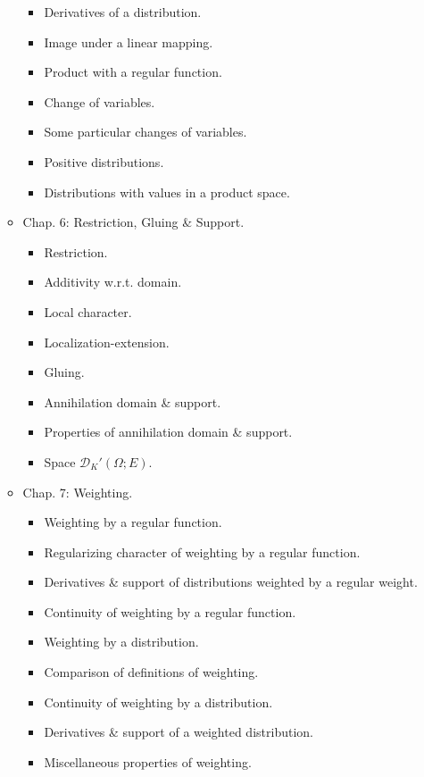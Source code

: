 \documentclass{article}
\begin{document}
\begin{enumerate}
\begin{itemize}
\begin{itemize}
			\item {\sf Derivatives of a distribution.}
			\item {\sf Image under a linear mapping.}
			\item {\sf Product with a regular function.}
			\item {\sf Change of variables.}
			\item {\sf Some particular changes of variables.}
			\item {\sf Positive distributions.}
			\item {\sf Distributions with values in a product space.}
		\end{itemize}
		\item {\sf Chap. 6: Restriction, Gluing \& Support.}
		\begin{itemize}
			\item {\sf Restriction.}
			\item {\sf Additivity w.r.t. domain.}
			\item {\sf Local character.}
			\item {\sf Localization-extension.}
			\item {\sf Gluing.}
			\item {\sf Annihilation domain \& support.}
			\item {\sf Properties of annihilation domain \& support.}
			\item {\sf Space $\mathcal{D}_K'(\Omega;E)$.}
		\end{itemize}
		\item {\sf Chap. 7: Weighting.}
		\begin{itemize}
			\item {\sf Weighting by a regular function.}
			\item {\sf Regularizing character of weighting by a regular function.}
			\item {\sf Derivatives \& support of distributions weighted by a regular weight.}
			\item {\sf Continuity of weighting by a regular function.}
			\item {\sf Weighting by a distribution.}
			\item {\sf Comparison of definitions of weighting.}
			\item {\sf Continuity of weighting by a distribution.}
			\item {\sf Derivatives \& support of a weighted distribution.}
			\item {\sf Miscellaneous properties of weighting.}
		\end{itemize}

\end{itemize}
\end{enumerate}
\end{document}
